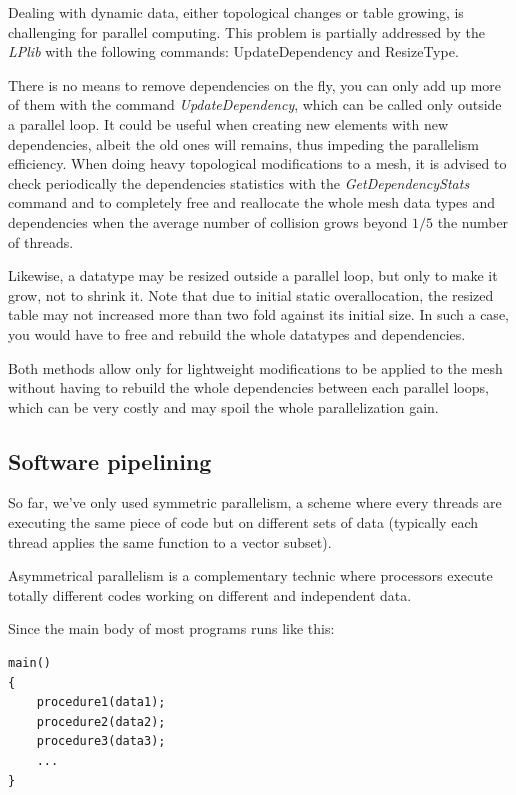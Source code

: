 \documentclass[a4paper,12pt]{article}
\begin{document}
Dealing with dynamic data, either topological changes or table growing, is challenging for parallel computing. This problem is partially addressed by the \emph{LPlib} with the following commands: UpdateDependency and ResizeType.

There is no means to remove dependencies on the fly, you can only add up more of them with the command \emph{UpdateDependency}, which can be called only outside a parallel loop. It could be useful when creating new elements with new dependencies, albeit the old ones will remains, thus impeding the parallelism efficiency. When doing heavy topological modifications to a mesh, it is advised to check periodically the dependencies statistics with the \emph{GetDependencyStats} command and to completely free and reallocate the whole mesh data types and dependencies when the average number of collision grows beyond $1/5$ the number of threads.

Likewise, a datatype may be resized outside a parallel loop, but only to make it grow, not to shrink it. Note that due to initial static overallocation, the resized table may not increased more than two fold against its initial size. In such a case, you would have to free and rebuild the whole datatypes and dependencies.

Both methods allow only for lightweight modifications to be applied to the mesh without having to rebuild the whole dependencies between each parallel loops, which can be very costly and may spoil the whole parallelization gain.


\subsection{Software pipelining}

So far, we've only used symmetric parallelism, a scheme where every threads are executing the same piece of code but on different sets of data (typically each thread applies the same function to a vector subset).

Asymmetrical parallelism is a complementary technic where processors execute totally different codes working on different and independent data.

Since the main body of most programs runs like this:

\begin{tt}
\begin{verbatim}
main()
{
    procedure1(data1);
    procedure2(data2);
    procedure3(data3);
    ...
}
\end{verbatim}
\end{tt}
\normalfont
\end{document}
